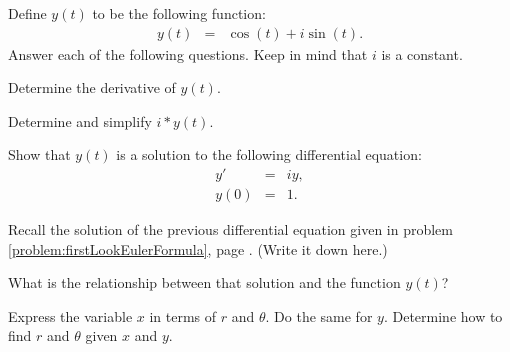   \begin{problem}

  \item Define $y(t)$ to be the following function:
    \begin{eqnarray*}
      y(t) & = & \cos(t) + i \sin(t).
    \end{eqnarray*}
    Answer each of the following questions. Keep in mind that $i$ is a
    constant.

    \begin{subproblem}
      \item Determine the derivative of $y(t)$. 
        \vfill

      \item Determine and simplify $i*y(t)$.
        \vfill

        \clearpage

      \item Show that $y(t)$ is a solution to the following
        differential equation:
        \begin{eqnarray*}
          y' & = & i y, \\
          y(0) & = & 1.
        \end{eqnarray*}

        \vfill

      \item Recall the solution of the previous differential equation
        given in problem \ref{problem:firstLookEulerFormula}, page
        \pageref{problem:firstLookEulerFormula}. (Write it down here.)

        \vspace{4em}

      \item What is the relationship between that solution and the
        function $y(t)$?
        \vfill
        

    \end{subproblem}

    \clearpage

  \item Express the variable $x$ in terms of $r$ and $\theta$. Do the
    same for $y$. Determine how to find $r$ and $\theta$ given $x$ and
    $y$. 


\end{problem}
